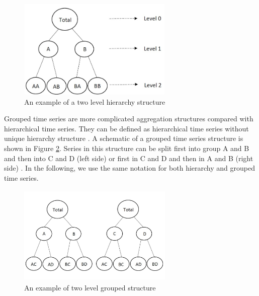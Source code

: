 \documentclass[11pt,a4paper,]{article}
\begin{document}
\begin{figure}

{\centering \includegraphics[width=280px,height=180px]{Paper-Figures/hierarchical_example} 

}

\caption{An example of a two level hierarchy structure}\label{fig:hierarchicalexample}
\end{figure}

Grouped time series are more complicated aggregation structures compared
with hierarchical time series. They can be defined as hierarchical time
series without unique hierarchy structure \autocite{hyndman2015hts}. A
schematic of a grouped time series structure is shown in Figure
\ref{fig:groupexample}. Series in this structure can be split first into
group A and B and then into C and D (left side) or first in C and D and
then in A and B (right side) \autocite{hyndman2016fast}. In the
following, we use the same notation for both hierarchy and grouped time
series.

\begin{figure}

{\centering \includegraphics[width=280px,height=180px]{hcf_files/figure-latex/groupexample-1} 

}

\caption{An example of two level grouped structure}\label{fig:groupexample}
\end{figure}
\end{document}
